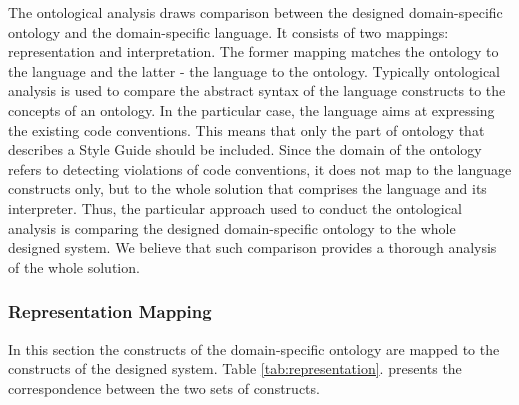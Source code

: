 \documentclass[parskip=full]{uvamscse}
\begin{document}
The ontological analysis draws comparison between the designed domain-specific ontology and the
domain-specific language. It consists of two mappings: representation and interpretation. The former
mapping matches the ontology to the language and the latter - the language to the ontology.
Typically ontological analysis is used to compare the abstract syntax of the language constructs to
the concepts of an ontology. In the particular case, the language aims at expressing the existing
code conventions. This means that only the part of ontology that describes a Style Guide should be
included. Since the domain of the ontology refers to detecting violations of code conventions, it
does not map to the language constructs only, but to the whole solution that comprises the language
and its interpreter. Thus, the particular approach used to conduct the ontological analysis is
comparing the designed domain-specific ontology to the whole designed system. We believe that such
comparison provides a thorough analysis of the whole solution.

\subsubsection{Representation Mapping} 

In this section the constructs of the domain-specific ontology are mapped to the constructs of the
designed system. Table \ref{tab:representation}. presents the correspondence between the two sets of constructs.
\end{document}
